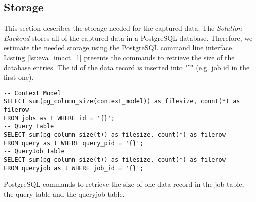 \documentclass[draft,final]{vutinfth} %
\begin{document}
\newpage
\subsection*{Storage}\label{Evaluation:impact_stor}

This section describes the storage needed for the captured data. The \textit{Solution Backend} stores all of the captured data in a PostgreSQL database. Therefore, we estimate the needed storage using the PostgreSQL command line interface. Listing \ref{lst:eva_imact_1} presents the commands to retrieve the size of the database entries. The id of the data record is inserted into "''" (e.g. job id in the first one).  

\begin{listing}[ht]
	\begin{verbatim}
-- Context Model 
SELECT sum(pg_column_size(context_model)) as filesize, count(*) as filerow 
FROM jobs as t WHERE id = '{}';
-- Query Table
SELECT sum(pg_column_size(t)) as filesize, count(*) as filerow 
FROM query as t WHERE query_pid = '{}';
-- QueryJob Table
SELECT sum(pg_column_size(t)) as filesize, count(*) as filerow 
FROM queryjob as t WHERE job_id = '{}';
	\end{verbatim}
	\caption{PostgreSQL commands to retrieve the size of one data record in the job table, the query table and the queryjob table.}
	\label{lst:eva_imact_1}
\end{listing}	

\end{document}
